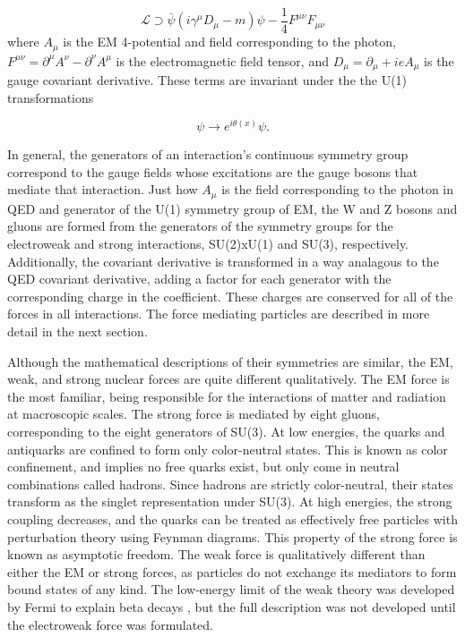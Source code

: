 \begin{equation}
\mathcal{L} \supset \bar{\psi} ( i \gamma^\mu D_\mu - m ) \psi - \frac{1}{4} F^{\mu\nu}F_{\mu\nu}
\end{equation}
where $A_\mu$ is the EM 4-potential and field corresponding to the photon, $F^{\mu\nu} = \partial^\mu A ^\nu - \partial^\nu A^\mu$ is the electromagnetic field tensor, and $D_\mu = \partial_\mu + i e A_\mu$ is the gauge covariant derivative. These terms are invariant under the the U(1) transformations

\begin{equation}
\psi \rightarrow e^{i\theta(x)} \psi.
\end{equation}

In general, the generators of an interaction's continuous symmetry group correspond to the gauge fields whose excitations are the gauge bosons that mediate that interaction. Just how $A_\mu$ is the field corresponding to the photon in QED and generator of the U(1) symmetry group of EM, the W and Z bosons and gluons are formed from the generators of the symmetry groups for the electroweak and strong interactions, SU(2)xU(1) and SU(3), respectively. Additionally, the covariant derivative is transformed in a way analagous to the QED covariant derivative, adding a factor for each generator with the corresponding charge in the coefficient. These charges are conserved for all of the forces in all interactions. The force mediating particles are described in more detail in the next section.

\indent Although the mathematical descriptions of their symmetries are similar, the EM, weak, and strong nuclear forces are quite different qualitatively. The EM force is the most familiar, being responsible for the interactions of matter and radiation at macroscopic scales. The strong force is mediated by eight gluons, corresponding to the eight generators of SU(3). At low energies, the quarks and antiquarks are confined to form only color-neutral states. This is known as color confinement, and implies no free quarks exist, but only come in neutral combinations called hadrons. Since hadrons are strictly color-neutral, their states transform as the singlet representation under SU(3). At high energies, the strong coupling decreases, and the quarks can be treated as effectively free particles with perturbation theory using Feynman diagrams. This property of the strong force is known as asymptotic freedom. The weak force is qualitatively different than either the EM or strong forces, as particles do not exchange its mediators to form bound states of any kind. The low-energy limit of the weak theory was developed by Fermi to explain beta decays \cite{}, but the full description was not developed until the electroweak force was formulated. 

